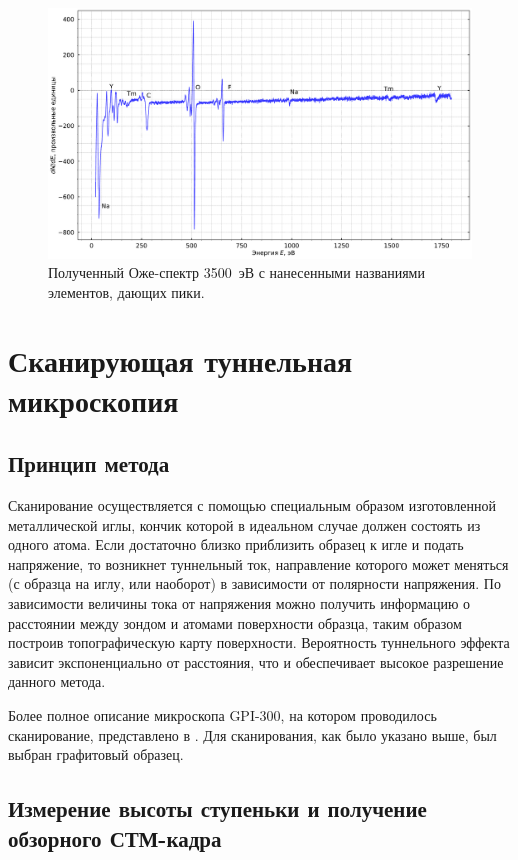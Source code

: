 \documentclass[a4paper, 12pt]{article}
\begin{document}
	\begin{figure}[H]
		\centering
		\includegraphics[width=0.9\linewidth]{1_Auge_3500}
		\caption{Полученный Оже-спектр 3500~эВ с нанесенными названиями элементов, дающих пики.}
		\label{fig:1_Auge_3500}
	\end{figure}
	
	\section{Сканирующая туннельная микроскопия}
	
	\subsection{Принцип метода}
	
	Сканирование осуществляется с помощью специальным образом изготовленной металлической иглы, кончик которой в идеальном случае должен состоять из одного атома. Если достаточно близко приблизить образец к игле и подать напряжение, то возникнет туннельный ток, направление которого может меняться (с образца на иглу, или наоборот) в зависимости от полярности напряжения. По зависимости величины тока от напряжения можно получить информацию о расстоянии между зондом и атомами поверхности образца, таким образом построив топографическую карту поверхности. Вероятность туннельного эффекта зависит экспоненциально от расстояния, что и обеспечивает высокое разрешение данного метода.
	
	Более полное описание микроскопа GPI-300, на котором проводилось сканирование, представлено в \cite{Eltsov}. Для сканирования, как было указано выше, был выбран графитовый образец.
	
	\subsection{Измерение высоты ступеньки и получение обзорного СТМ-кадра}
	
\end{document}
